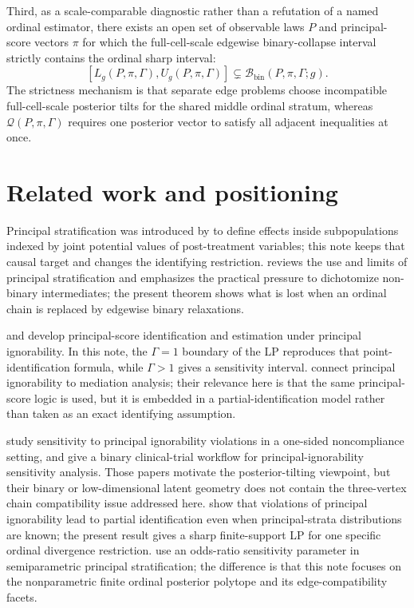 \documentclass[11pt]{article}
\theoremstyle{definition}
\theoremstyle{plain}
\theoremstyle{remark}
\begin{document}
Third, as a scale-comparable diagnostic rather than a refutation of a named ordinal estimator, there exists an open set of observable laws \(P\) and principal-score vectors \(\pi\) for which the full-cell-scale edgewise binary-collapse interval strictly contains the ordinal sharp interval:
\[
  [L_g(P,\pi,\Gamma),U_g(P,\pi,\Gamma)]
  \subsetneq
  \mathcal B_{\mathrm{bin}}(P,\pi,\Gamma;g).
\]
The strictness mechanism is that separate edge problems choose incompatible full-cell-scale posterior tilts for the shared middle ordinal stratum, whereas \(\mathcal Q(P,\pi,\Gamma)\) requires one posterior vector to satisfy all adjacent inequalities at once.

\section{Related work and positioning}
Principal stratification was introduced by \cite{FrangakisRubin2002} to define
effects inside subpopulations indexed by joint potential values of
post-treatment variables; this note keeps that causal target and changes the
identifying restriction.  \cite{VanderWeele2011} reviews the use and limits of
principal stratification and emphasizes the practical pressure to dichotomize
non-binary intermediates; the present theorem shows what is lost when an
ordinal chain is replaced by edgewise binary relaxations.

\cite{DingLu2017} and \cite{JiangYangDing2022} develop principal-score
identification and estimation under principal ignorability.  In this note, the
\(\Gamma=1\) boundary of the LP reproduces that point-identification formula,
while \(\Gamma>1\) gives a sensitivity interval.  \cite{ForastiereMatteiDing2018}
connect principal ignorability to mediation analysis; their relevance here is
that the same principal-score logic is used, but it is embedded in a
partial-identification model rather than taken as an exact identifying
assumption.

\cite{NguyenStuartScharfsteinOgburn2024} study sensitivity to principal
ignorability violations in a one-sided noncompliance setting, and
\cite{WangZhangMealliBornkamp2023} give a binary clinical-trial workflow for
principal-ignorability sensitivity analysis.  Those papers motivate the
posterior-tilting viewpoint, but their binary or low-dimensional latent
geometry does not contain the three-vertex chain compatibility issue addressed
here.  \cite{WuAntonelli2024} show that violations of principal ignorability
lead to partial identification even when principal-strata distributions are
known; the present result gives a sharp finite-support LP for one specific
ordinal divergence restriction.  \cite{TongKahanHarhayLi2025} use an
odds-ratio sensitivity parameter in semiparametric principal stratification;
the difference is that this note focuses on the nonparametric finite ordinal
posterior polytope and its edge-compatibility facets.
\end{document}
